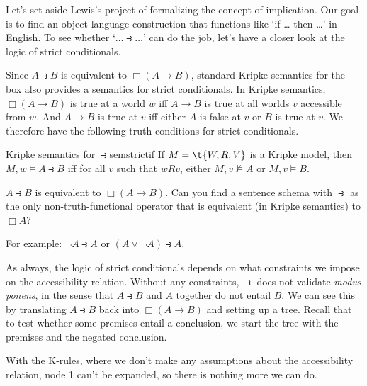 Let's set aside Lewis's project of formalizing the concept of implication. Our
goal is to find an object-language construction that functions like `if \ldots
then \ldots' in English. To see whether `$\ldots \strictif\ldots$' can do the job,
let's have a closer look at the logic of strict conditionals.

Since $A \strictif B$ is equivalent to $\Box(A \to B)$, standard Kripke
semantics for the box also provides a semantics for strict conditionals. In
Kripke semantics, $\Box(A \to B)$ is true at a world $w$ iff $A \to B$ is true
at all worlds $v$ accessible from $w$. And $A \to B$ is true at $v$ iff either
$A$ is false at $v$ or $B$ is true at $v$. We therefore have the following
truth-conditions for strict conditionals.

\begin{definition}{Kripke semantics for $\strictif$}{semstrictif}
  If $M = \t{W,R,V}$ is a Kripke model, then\\[1mm]
  $M,w \models A \strictif B$ iff for all $v$ such that $wRv$, either
  $M,v \not\models A$ or $M,v \models B$.
\end{definition}

\begin{exercise}
  $A \strictif B$ is equivalent to $\Box(A \to B)$. Can you find a sentence
  schema with $\strictif$ as the only non-truth-functional operator that is
  equivalent (in Kripke semantics) to $\Box A$?
\end{exercise}
\begin{solution}
  For example: $\neg A \strictif A$ or $(A\lor \neg A) \strictif A$.
\end{solution}

As always, the logic of strict conditionals depends on what constraints we
impose on the accessibility relation. Without any constraints, $\strictif$ does
not validate \emph{modus ponens}, in the sense that $A \strictif B$ and $A$
together do not entail $B$. We can see this by translating
$A \strictif B$ back into $\Box(A \to B)$ and setting up a tree. Recall that to
test whether some premises entail a conclusion, we start the tree with the
premises and the negated conclusion.
%
\begin{center}
\end{center}
%
With the K-rules, where we don't make any assumptions about the accessibility
relation, node 1 can't be expanded, so there is nothing more we can do.

